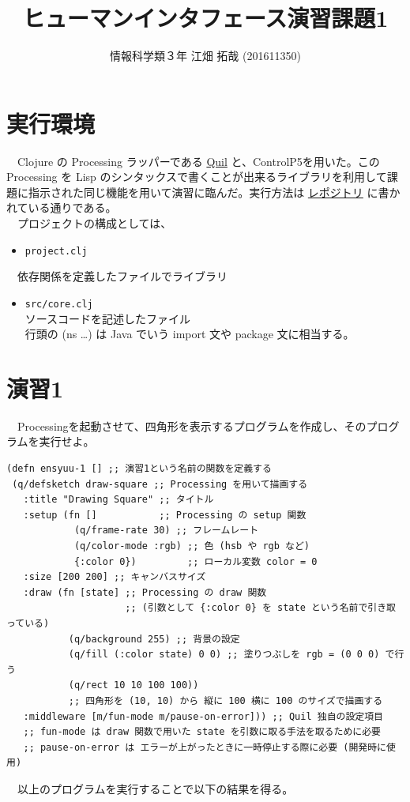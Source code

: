 \documentclass{scrartcl}
\author{情報科学類３年 江畑 拓哉 (201611350)}
\date{}
\title{ヒューマンインタフェース演習課題1}
\begin{document}
\maketitle
\tableofcontents


\section{実行環境}
\label{sec:org45a7186}
　Clojure の Processing ラッパーである \href{http://quil.info/}{Quil} と、ControlP5を用いた。この Processing を Lisp のシンタックスで書くことが出来るライブラリを利用して課題に指示された同じ機能を用いて演習に臨んだ。実行方法は \href{https://github.com/MokkeMeguru/hello-processing}{レポジトリ} に書かれている通りである。\\
　プロジェクトの構成としては、\\
\begin{itemize}
\item \texttt{project.clj} \\
\end{itemize}
　依存関係を定義したファイルでライブラリ\\
\begin{itemize}
\item \texttt{src/core.clj}\\
ソースコードを記述したファイル\\
行頭の (ns \ldots{}) は Java でいう import 文や package 文に相当する。\\
\end{itemize}
\section{演習1}
\label{sec:orgce0a996}
　Processingを起動させて、四角形を表示するプログラムを作成し、そのプログラムを実行せよ。\\
\begin{verbatim}
(defn ensyuu-1 [] ;; 演習1という名前の関数を定義する
 (q/defsketch draw-square ;; Processing を用いて描画する
   :title "Drawing Square" ;; タイトル
   :setup (fn []           ;; Processing の setup 関数 
            (q/frame-rate 30) ;; フレームレート
            (q/color-mode :rgb) ;; 色 (hsb や rgb など)
            {:color 0})         ;; ローカル変数 color = 0
   :size [200 200] ;; キャンバスサイズ
   :draw (fn [state] ;; Processing の draw 関数
                     ;; (引数として {:color 0} を state という名前で引き取っている)
           (q/background 255) ;; 背景の設定
           (q/fill (:color state) 0 0) ;; 塗りつぶしを rgb = (0 0 0) で行う
           (q/rect 10 10 100 100))
           ;; 四角形を (10, 10) から 縦に 100 横に 100 のサイズで描画する
   :middleware [m/fun-mode m/pause-on-error])) ;; Quil 独自の設定項目
   ;; fun-mode は draw 関数で用いた state を引数に取る手法を取るために必要
   ;; pause-on-error は エラーが上がったときに一時停止する際に必要 (開発時に使用)
\end{verbatim}
　以上のプログラムを実行することで以下の結果を得る。\\
\end{document}
